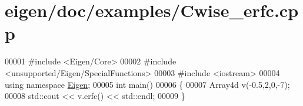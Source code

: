 \hypertarget{eigen_2doc_2examples_2_cwise__erfc_8cpp_source}{}\section{eigen/doc/examples/\+Cwise\+\_\+erfc.cpp}
\label{eigen_2doc_2examples_2_cwise__erfc_8cpp_source}

\begin{DoxyCode}
00001 \textcolor{preprocessor}{#include <Eigen/Core>}
00002 \textcolor{preprocessor}{#include <unsupported/Eigen/SpecialFunctions>}
00003 \textcolor{preprocessor}{#include <iostream>}
00004 \textcolor{keyword}{using namespace }\hyperlink{namespace_eigen}{Eigen};
00005 \textcolor{keywordtype}{int} main()
00006 \{
00007   Array4d v(-0.5,2,0,-7);
00008   std::cout << v.erfc() << std::endl;
00009 \}
\end{DoxyCode}
